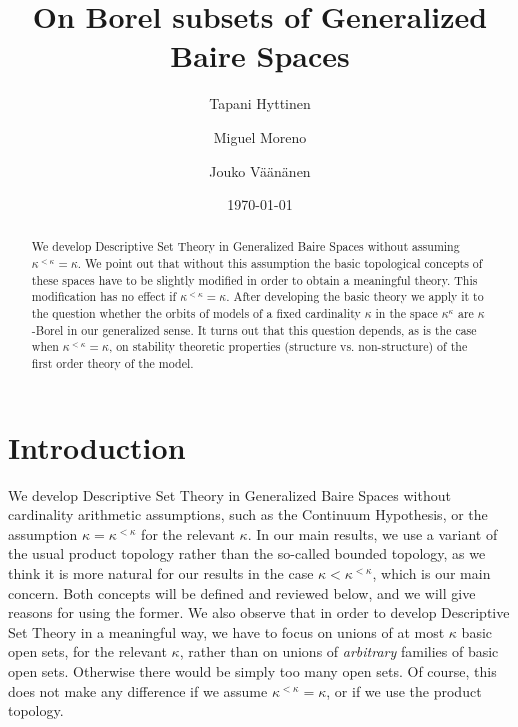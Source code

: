 \documentclass[12pt,a4paper]{amsart}
\title{On Borel subsets of Generalized Baire Spaces}
\author{Tapani Hyttinen}
\author{Miguel Moreno}
\author{Jouko Väänänen}
\theoremstyle{definition}
\theoremstyle{remark}
\begin{document}
\begin{abstract}
We develop Descriptive Set Theory in Generalized Baire Spaces without assuming $\kappa^{<\kappa}=\kappa$. We point out that without this assumption the basic topological concepts of these spaces have to be slightly modified in order to obtain a meaningful theory. This modification has no effect if $\kappa^{<\kappa}=\kappa$. After developing the basic theory we apply it to the question whether the orbits of models  of a fixed cardinality $\kappa$ in the space  $\kappa^\kappa$ are $\kappa$-Borel in our generalized sense. It turns out that this question depends, as is the case when $\kappa^{<\kappa}=\kappa$, on stability theoretic properties (structure vs. non-structure) of the first order theory of the model.
\end{abstract}

\date{\today}

\maketitle

\section{Introduction}



We develop Descriptive Set Theory in Generalized Baire Spaces without cardinality arithmetic assumptions, such as the Continuum Hypothesis, or the assumption $\kappa=\kappa^{<\kappa}$ for the relevant $\kappa$. In our main results, we use a variant of the usual product topology rather than the so-called bounded topology, as we think it is more natural for our results in the case $\kappa<\kappa^{<\kappa}$, which is our main concern. Both concepts will be defined and reviewed below, and we will give reasons for using the former. We also observe that in order to develop Descriptive Set Theory in a meaningful way, we have to focus on unions of at most $\kappa$ basic open sets, for the relevant $\kappa$, rather than on unions of \emph{arbitrary} families of basic open sets. Otherwise there would be simply too many  open sets. Of course, this does not make any difference if we assume $\kappa^{<\kappa}=\kappa$, or if we use the product topology. 
\end{document}
